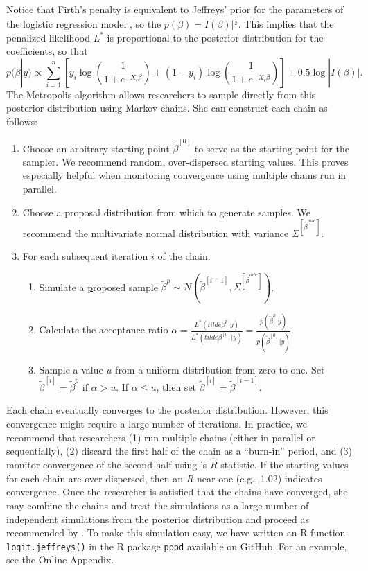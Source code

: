 \documentclass[12pt]{article}
\begin{document}
Notice that Firth's penalty \citep{Firth1993} is equivalent to Jeffreys' prior for the parameters of the logistic regression model \citep{Jeffreys1946, Poirier1994}, so the $p(\beta) = I(\beta)|^\frac{1}{2}$. This implies that the penalized likelihood $L^*$ is proportional to the posterior distribution for the coefficients, so that 
\begin{equation}\label{eqn:post}
p(\beta | y) \propto \sum_{i = 1}^n \left[y_i \log \left( \dfrac{1}{1 + e^{-X_i\beta}}\right) + (1 - y_i) \log \left( \dfrac{1}{1 + e^{-X_i\beta}}\right)\right] + 0.5 \log |I(\beta)|.
\end{equation}
The Metropolis algorithm \citep{Metropolisetal1953, Gelmanetal2013} allows researchers to sample directly from this posterior distribution using Markov chains. She can construct each chain as follows:
\begin{enumerate}
\item Choose an arbitrary starting point $\tilde{\beta}^{[0]}$ to serve as the starting point for the sampler.  We recommend random, over-dispersed starting values. This proves especially helpful when monitoring convergence using multiple chains run in parallel. 
\item Choose a proposal distribution from which to generate samples. We recommend the multivariate normal distribution with variance $\Sigma^{[\hat{\beta}^{mle}]}$.
\item For each subsequent iteration $i$ of the chain:
	\begin{enumerate}
	\item Simulate a \underline{p}roposed sample $\tilde{\beta}^{p} \sim N(\tilde{\beta}^{[i - 1]}, \Sigma^{[\hat{\beta}^{mle}]})$.
	\item Calculate the acceptance ratio $\alpha = \frac{L^*(tilde{\beta}^{p} | y)}{L^*(tilde{\beta}^{[0]} | y)} = \frac{p(\tilde{\beta}^{p} | y)}{p(\tilde{\beta}^{[0]} | y)}$.
	\item Sample a value $u$ from a uniform distribution from zero to one. Set $\tilde{\beta}^{[i]} = \tilde{\beta}^{p}$ if $\alpha > u$. If $\alpha \leq u$, then set $\tilde{\beta}^{[i]} = \tilde{\beta}^{[i - 1]}$.
	\end{enumerate}
\end{enumerate} 

Each chain eventually converges to the posterior distribution. However, this convergence might require a large number of iterations. In practice, we recommend that researchers (1) run multiple chains (either in parallel or sequentially), (2) discard the first half of the chain as a ``burn-in'' period, and (3) monitor convergence of the second-half using \citet{GelmanRubin1992}'s $\hat{R}$ statistic. If the starting values for each chain are over-dispersed, then an $\hat{R}$ near one (e.g., 1.02) indicates convergence. Once the researcher is satisfied that the chains have converged, she may combine the chains and treat the simulations as a large number of independent simulations from the posterior distribution and proceed as recommended by \citet{KingTomzWittenberg2000}. To make this simulation easy, we have written an R function \texttt{logit.jeffreys()} in the R package \texttt{pppd} available on GitHub. For an example, see the Online Appendix.
\end{document}
